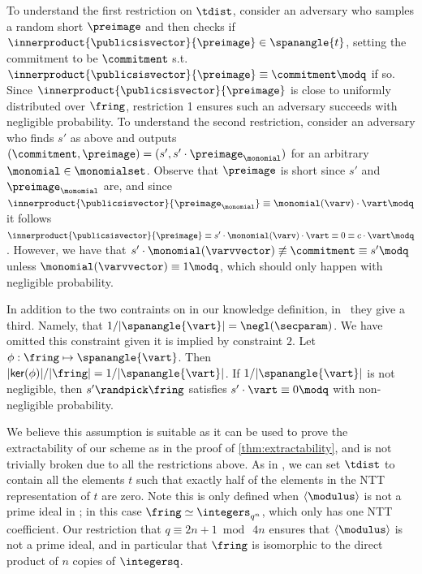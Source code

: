 To understand the first restriction on $\tdist$, consider an adversary who samples a random short $\preimage$ and then checks if $\innerproduct{\publicsisvector}{\preimage} \in \spanangle{t}$, setting the commitment to be $\commitment$ s.t. $\innerproduct{\publicsisvector}{\preimage} \equiv \commitment \modq$ if so. Since $\innerproduct{\publicsisvector}{\preimage}$ is close to uniformly distributed over $\fring$, restriction 1 ensures such an adversary succeeds with negligible probability. To understand the second restriction, consider an adversary who finds $s'$ as above and outputs $(\commitment, \preimage) = (s', s'\cdot \preimage_{\monomial})$ for an arbitrary $\monomial \in \monomialset$. Observe that $\preimage$ is short since $s'$ and $\preimage_\monomial$ are, and since $\innerproduct{\publicsisvector}{\preimage_\monomial} \equiv \monomial(\varv) \cdot \vart \modq$ it follows $\innerproduct{\publicsisvector}{\preimage} \equiv s'\cdot \monomial(\varv) \cdot \vart \equiv 0 \equiv c\cdot \vart \modq$. However, we have that $s' \cdot \monomial(\varvvector) \not\equiv \commitment \equiv s' \modq$ unless $\monomial(\varvvector) \equiv 1 \modq$, which should only happen with negligible probability.

In addition to the two contraints on \tdist in our knowledge \krisis definition, in~\cite{C:ACLMT22} they give a third. Namely, that $1/\vert\spanangle{\vart}\vert = \negl(\secparam)$. We have omitted this constraint given it is implied by constraint $2$. Let $\phi: \fring \mapsto \spanangle{\vart}$. Then $\vert \mathsf{ker}(\phi) \vert / \vert \fring \vert = 1/\vert\spanangle{\vart}\vert$. If $1/\vert\spanangle{\vart}\vert$ is not negligible, then $s' \randpick \fring$ satisfies $s' \cdot \vart \equiv 0 \modq$ with non-negligible probability.

We believe this assumption is suitable as it can be used to prove the extractability of our scheme as in the proof of \cref{thm:extractability}, and is not trivially broken due to all the restrictions above. As in \cite{C:ACLMT22}, we can set $\tdist$ to contain all the elements $t$ such that exactly half of the elements in the NTT representation of $t$ are zero. Note this is only defined when $\langle \modulus \rangle$ is not a prime ideal in \ring; in this case $\fring \simeq \integers_{q^n}$, which only has one NTT coefficient. Our restriction that $q \equiv 2n+1 \bmod\ 4n$ ensures that $\langle \modulus \rangle$ is not a prime ideal, and in particular that $\fring$ is isomorphic to the direct product of $n$ copies of $\integersq$.


